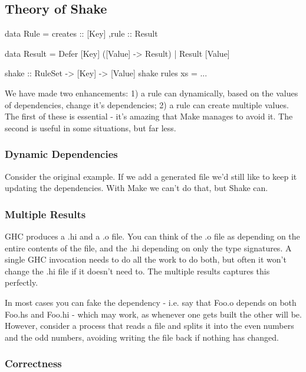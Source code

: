 \documentclass{sigplanconf}
\begin{document}
\subsection{Theory of Shake}

\begin{code}
data Rule =
    {creates :: [Key]
    ,rule :: Result
    }

data Result = Defer [Key] ([Value] -> Result)
            | Result [Value]

shake :: RuleSet -> [Key] -> [Value]
shake rules xs = ...
\end{code}

We have made two enhancements: 1) a rule can dynamically, based on the values of dependencies, change it's dependencies; 2) a rule can create multiple values. The first of these is essential - it's amazing that Make manages to avoid it. The second is useful in some situations, but far less.

\subsubsection{Dynamic Dependencies}

Consider the original example. If we add a generated file we'd still like to keep it updating the dependencies. With Make we can't do that, but Shake can.

\subsubsection{Multiple Results}

GHC produces a .hi and a .o file. You can think of the .o file as depending on the entire contents of the file, and the .hi depending on only the type signatures. A single GHC invocation needs to do all the work to do both, but often it won't change the .hi file if it doesn't need to. The multiple results captures this perfectly.

In most cases you can fake the dependency - i.e. say that Foo.o depends on both Foo.hs and Foo.hi - which may work, as whenever one gets built the other will be. However, consider a process that reads a file and splits it into the even numbers and the odd numbers, avoiding writing the file back if nothing has changed.

\subsubsection{Correctness}
\end{document}
